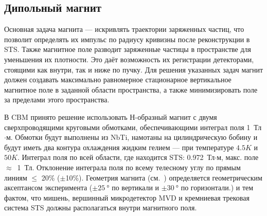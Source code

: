 
\subsection{Дипольный магнит}\label{sec:secMagnet}

Основная задача магнита --- искривлять траектории заряженных частиц, что позволит определять их импульс по радиусу кривизны после реконструкции в STS. Также магнитное поле разводит заряженные частицы в пространстве для уменьшения их плотности. Это даёт возможность их регистрации детекторами, стоящими как внутри, так и ниже по пучку. Для решения указанных задач магнит должен создавать максимально равномерное стационарное вертикальное магнитное поле в заданной области пространства, а также минимизировать поле за пределами этого пространства.

В CBM принято решение использовать Н-образный магнит с двумя сверхпроводящими круговыми обмотками, обеспечивающими интеграл поля 1~Тл$\cdot$м. Обмотки будут выполнены из NbTi, намотаны на цилиндрическую бобину и будут иметь два контура охлаждения жидким гелием --- при температуре $4.5K$ и $50K$.
Интеграл поля по всей области, где находится STS: 0.972~Тл$\cdot$м, макс. поле $\approx$~1~Тл. Отклонение интеграла поля по всему телесному углу по прямым линиям $\leq$ 20\% ($\pm$10\%).
Геометрия магнита (см.~) определяется геометрическим аксептансом эксперимента ($\pm \SI{25}{\degree}$ по вертикали и $\pm \SI{30}{\degree}$ по горизонтали.) и тем фактом, что мишень, вершинный микродетектор MVD и кремниевая трековая система STS должны располагаться внутри магнитного поля.

